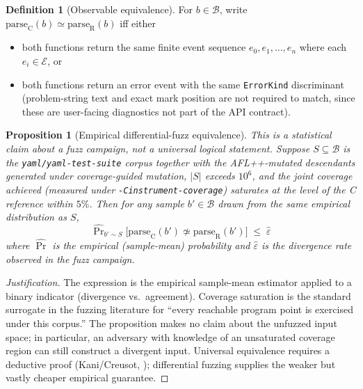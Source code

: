 \documentclass[12pt]{article}
\newtheorem{proposition}[theorem]{Proposition}
\theoremstyle{definition}
\newtheorem{definition}[theorem]{Definition}
\theoremstyle{remark}
\begin{document}
\begin{definition}[Observable equivalence]
\label{def:obseq}
For $b \in \mathcal{B}$, write $\mathrm{parse}_{\mathrm{C}}(b) \simeq
\mathrm{parse}_{\mathrm{R}}(b)$ iff either
\begin{itemize}
\item both functions return the same finite event sequence
$e_0, e_1, \dots, e_n$ where each $e_i \in \mathcal{E}$, or
\item both functions return an error event with the same
\texttt{ErrorKind} discriminant (problem-string text and exact mark
position are not required to match, since these are user-facing
diagnostics not part of the API contract).
\end{itemize}
\end{definition}

\begin{proposition}[Empirical differential-fuzz equivalence]
\label{prop:diff}
This is a \emph{statistical claim about a fuzz campaign}, not a
universal logical statement. Suppose $S \subseteq \mathcal{B}$ is the
\texttt{yaml/yaml-test-suite} corpus together with the AFL++-mutated
descendants generated under coverage-guided mutation, $|S|$ exceeds
$10^6$, and the joint coverage achieved (measured under
\texttt{-Cinstrument-coverage}) saturates at the level of the C reference
within $5\%$. Then for any sample $b' \in \mathcal{B}$ drawn from the
\emph{same empirical distribution} as $S$,
\[
\widehat{\Pr}_{b' \sim S}\!\bigl[
   \mathrm{parse}_{\mathrm{C}}(b') \not\simeq
   \mathrm{parse}_{\mathrm{R}}(b')\bigr]
\;\le\; \widehat{\varepsilon}
\]
where $\widehat{\Pr}$ is the empirical (sample-mean) probability and
$\widehat{\varepsilon}$ is the divergence rate observed in the fuzz
campaign.
\end{proposition}

\begin{proof}[Justification]
The expression is the empirical sample-mean estimator applied to a
binary indicator (divergence vs.\ agreement). Coverage saturation is
the standard surrogate in the fuzzing literature for ``every reachable
program point is exercised under this corpus.'' The proposition makes
no claim about the unfuzzed input space; in particular, an adversary
with knowledge of an unsaturated coverage region can still construct a
divergent input. Universal equivalence requires a deductive proof
(Kani/Creusot, ); differential fuzzing supplies the
weaker but vastly cheaper empirical guarantee.
\end{proof}
\end{document}
